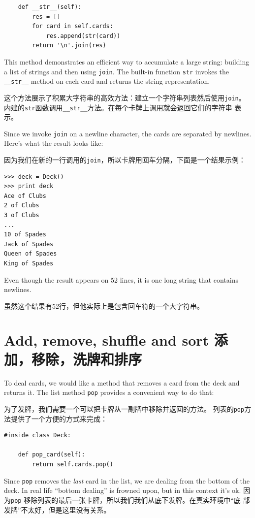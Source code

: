 \documentclass[10pt]{book}
\begin{document}
\begin{CJK}{UTF8}{gbsn}
\begin{verbatim}
    def __str__(self):
        res = []
        for card in self.cards:
            res.append(str(card))
        return '\n'.join(res)
\end{verbatim}
%
This method demonstrates an efficient way to accumulate a large
string: building a list of strings and then using {\tt join}.
The built-in function {\tt str} invokes the \verb"__str__"
method on each card and returns the string representation.

这个方法展示了积累大字符串的高效方法：建立一个字符串列表然后使用{\tt join}。
内建的{\tt str}函数调用\verb"__str__"方法。在每个卡牌上调用就会返回它们的字符串
表示。

Since we invoke {\tt join} on a newline character, the cards
are separated by newlines.  Here's what the result looks like:

因为我们在新的一行调用的{\tt join}，所以卡牌用回车分隔，下面是一个结果示例：

\begin{verbatim}
>>> deck = Deck()
>>> print deck
Ace of Clubs
2 of Clubs
3 of Clubs
...
10 of Spades
Jack of Spades
Queen of Spades
King of Spades
\end{verbatim}
%
Even though the result appears on 52 lines, it is
one long string that contains newlines.

虽然这个结果有52行，但他实际上是包含回车符的一个大字符串。


\section{Add, remove, shuffle and sort 添加，移除，洗牌和排序}

To deal cards, we would like a method that
removes a card from the deck and returns it.
The list method {\tt pop} provides a convenient way to do that:

为了发牌，我们需要一个可以把卡牌从一副牌中移除并返回的方法。
列表的{\tt pop}方法提供了一个方便的方式来完成：

\begin{verbatim}
#inside class Deck:

    def pop_card(self):
        return self.cards.pop()
\end{verbatim}
%
Since {\tt pop} removes the {\em last} card in the list, we are
dealing from the bottom of the deck.  In real life ``bottom dealing'' is
frowned upon,
but in this context it's ok.
因为{\tt pop} 移除列表的最后一张卡牌，所以我们我们从底下发牌。在真实环境中``底
部发牌''不太好，但是这里没有关系。


\end{CJK}
\end{document}
